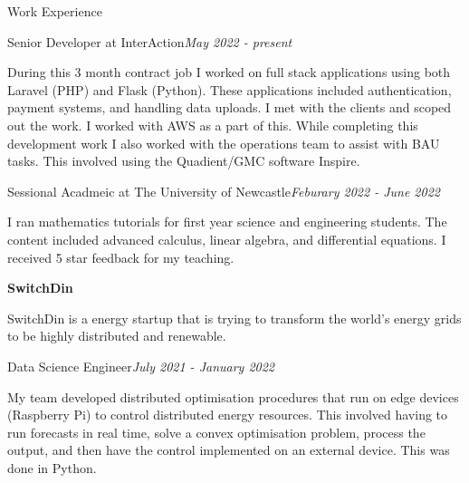 \documentclass{resume} %
\begin{document}
\begin{rSection}{Work Experience}

    \begin{rSubsection}{Senior Developer at InterAction}{\em May 2022 - present}{}{}
        \item During this 3 month contract job I worked on full stack applications using both Laravel (PHP) and Flask (Python).
        These applications included authentication, payment systems, and handling data uploads.
        I met with the clients and scoped out the work. I worked with AWS as a part of this.
        While completing this development work I also worked with the operations team to assist with BAU tasks.
        This involved using the Quadient/GMC software Inspire.
    \end{rSubsection}

    \begin{rSubsection}{Sessional Acadmeic at The University of Newcastle}{\em Feburary 2022 - June 2022}{}{}
        \item I ran mathematics tutorials for first year science and engineering students.
        The content included advanced calculus, linear algebra, and differential equations. I received 5 star feedback for my teaching.
    \end{rSubsection}

    {\bf SwitchDin}

    SwitchDin is a energy startup that is trying to transform the world's energy grids to be highly
    distributed and renewable.

    \begin{adjustwidth}{2em}{}
        \begin{rSubsection}{Data Science Engineer}{\em July 2021 - January 2022}{}{}
            \item My team developed distributed optimisation procedures that run on edge devices (Raspberry Pi) to control
            distributed energy resources. This involved having to run forecasts in real time, solve a convex optimisation problem, process the output, and
            then have the control implemented on an external device. This was done in Python.
        \end{rSubsection}


\end{adjustwidth}
\end{rSection}
\end{document}
